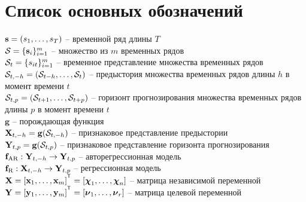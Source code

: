 \chapter*{Список основных обозначений}
\noindent $\mathbf{s} = (s_1, \dots, s_T)$ -- временной ряд длины $T$ \\
$\mathcal{S} = \{\mathbf{s}_i\}_{i=1}^m$ -- множество из $m$ временных рядов \\
$\mathcal{S}_t = \{s_{it}\}_{i=1}^m$ -- временное представление множества временных рядов \\
$\mathcal{S}_{t, -h} = (\mathcal{S}_{t - h}, \dots, \mathcal{S}_{t})$ -- предыстория множества временных рядов длины $h$ в момент времени $t$ \\
$\mathcal{S}_{t, p} = (\mathcal{S}_{t + 1}, \dots, \mathcal{S}_{t + p})$ -- горизонт прогнозирования множества временных рядов длины $p$ в момент времени $t$ \\
$\mathbf{g}$ -- порождающая функция \\
$\mathbf{X}_{t, -h} = \mathbf{g}(\mathcal{S}_{t, -h})$ -- признаковое представление предыстории \\
$\mathbf{Y}_{t, p} = \mathbf{g}(\mathcal{S}_{t, p})$ -- признаковое представление горизонта прогнозирования \\
$\mathbf{f}_{\text{AR}}: \mathbf{Y}_{t, -h} \rightarrow \mathbf{Y}_{t, p}$ -- авторегрессионная модель \\
$\mathbf{f}_{\text{R}}: \mathbf{X}_{t, -h} \rightarrow \mathbf{Y}_{t, p}$ -- регрессионная модель \\
$\bX = [\bx_1, \dots, \bx_m]^{\T} =  [\bchi_1, \dots, \bchi_n]$ -- матрица независимой переменной \\
$\bY = [\by_1, \dots, \by_m]^{\T} =  [\bnu_1, \dots, \bnu_r]$ -- матрица целевой переменной \\



